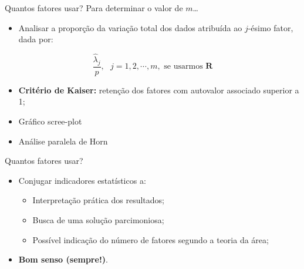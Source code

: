 \documentclass[
  ignorenonframetext,
  aspectratio=169,
]{beamer}
\providecommand{\tightlist}{%
  \setlength{\itemsep}{0pt}\setlength{\parskip}{0pt}}
\begin{document}
\begin{frame}{Quantos fatores usar?}
\label{quantos-fatores-usar}
Para determinar o valor de \(m\)\ldots{}

\begin{itemize}
\tightlist
\item
  Analisar a proporção da variação total dos dados atribuída ao
  \(j\)-ésimo fator, dada por:
\end{itemize}

\[\dfrac{\hat{\lambda}_j}{p}, \,\,\,\, j = 1,2, \cdots, m, \text{ se usarmos } \boldsymbol{R}\]

\vspace{0.5cm}

\pause

\begin{itemize}
\tightlist
\item
  \textbf{Critério de Kaiser:} retenção dos fatores com autovalor
  associado superior a 1;
\end{itemize}

\vspace{0.5cm}

\pause

\begin{itemize}
\tightlist
\item
  Gráfico scree-plot
\end{itemize}

\vspace{0.5cm}

\pause

\begin{itemize}
\tightlist
\item
  Análise paralela de Horn
\end{itemize}
\end{frame}

\begin{frame}{Quantos fatores usar?}
\label{quantos-fatores-usar-1}
\begin{itemize}
\tightlist
\item
  Conjugar indicadores estatísticos a:

  \begin{itemize}
  \tightlist
  \item
    Interpretação prática dos resultados;
  \item
    Busca de uma solução parcimoniosa;
  \item
    Possível indicação do número de fatores segundo a teoria da área;
  \end{itemize}
\end{itemize}

\vspace{0.3cm}

\pause

\begin{itemize}
\tightlist
\item
  \textbf{Bom senso (sempre!)}.
\end{itemize}
\end{frame}
\end{document}
